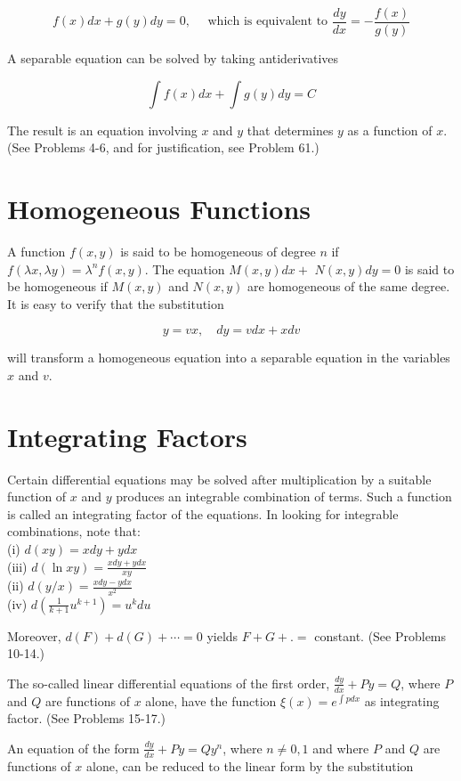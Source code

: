 \documentclass[10pt]{article}
\begin{document}
$$
f(x) d x+g(y) d y=0, \quad \text { which is equivalent to } \frac{d y}{d x}=-\frac{f(x)}{g(y)}
$$

A separable equation can be solved by taking antiderivatives

$$
\int f(x) d x+\int g(y) d y=C
$$

The result is an equation involving $x$ and $y$ that determines $y$ as a function of $x$. (See Problems 4-6, and for justification, see Problem 61.)

\section*{Homogeneous Functions}
A function $f(x, y)$ is said to be homogeneous of degree $n$ if $f(\lambda x, \lambda y)=\lambda^{n} f(x, y)$. The equation $M(x, y) d x+$ $N(x, y) d y=0$ is said to be homogeneous if $M(x, y)$ and $N(x, y)$ are homogeneous of the same degree. It is easy to verify that the substitution

$$
y=v x, \quad d y=v d x+x d v
$$

will transform a homogeneous equation into a separable equation in the variables $x$ and $v$.

\section*{Integrating Factors}
Certain differential equations may be solved after multiplication by a suitable function of $x$ and $y$ produces an integrable combination of terms. Such a function is called an integrating factor of the equations. In looking for integrable combinations, note that:\\
(i) $d(x y)=x d y+y d x$\\
(iii) $d(\ln x y)=\frac{x d y+y d x}{x y}$\\
(ii) $d(y / x)=\frac{x d y-y d x}{x^{2}}$\\
(iv) $d\left(\frac{1}{k+1} u^{k+1}\right)=u^{k} d u$

Moreover, $d(F)+d(G)+\cdots=0$ yields $F+G+.=$ constant. (See Problems 10-14.)

The so-called linear differential equations of the first order, $\frac{d y}{d x}+P y=Q$, where $P$ and $Q$ are functions of $x$ alone, have the function $\xi(x)=e^{\int p d x}$ as integrating factor. (See Problems 15-17.)

An equation of the form $\frac{d y}{d x}+P y=Q y^{n}$, where $n \neq 0,1$ and where $P$ and $Q$ are functions of $x$ alone, can be reduced to the linear form by the substitution
\end{document}
